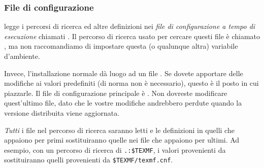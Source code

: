 \documentclass{article}
\begin{document}
\subsubsection{File di configurazione}

\KPS{} legge i percorsi di ricerca ed altre definizioni nei \emph{file di
configurazione a tempo di esecuzione} chiamati . Il
percorso di ricerca usato per cercare questi file è chiamato
, ma non raccomandiamo di impostare questa (o qualunque
altra) variabile d'ambiente.

Invece, l'installazione normale dà luogo ad un file
. Se dovete apportare delle modifiche ai valori
predefiniti (di norma non è necessario), questo è il posto in cui
piazzarle. Il file di configurazione principale è
. Non dovreste modificare
quest'ultimo file, dato che le vostre modifiche andrebbero perdute quando
la versione distribuita viene aggiornata.

\emph{Tutti} i file  nel percorso di ricerca saranno letti
e le definizioni in quelli che appaiono per primi sostituiranno quelle nei
file che appaiono per ultimi. Ad esempio, con un percorso di ricerca di
\verb|.:$TEXMF|, i valori provenienti da  sostituiranno
quelli provenienti da \verb|$TEXMF/texmf.cnf|.
\end{document}
